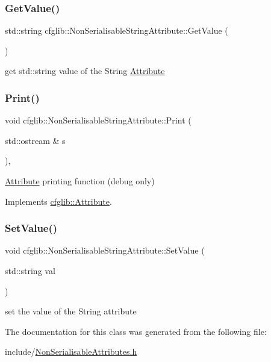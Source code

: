 \subsubsection{\texorpdfstring{Get\+Value()}{GetValue()}}
{\footnotesize\ttfamily std\+::string cfglib\+::\+Non\+Serialisable\+String\+Attribute\+::\+Get\+Value (\begin{DoxyParamCaption}{ }\end{DoxyParamCaption})\hspace{0.3cm}{\ttfamily [inline]}}

get std\+::string value of the String \hyperlink{classcfglib_1_1Attribute}{Attribute} \mbox{\label{classcfglib_1_1NonSerialisableStringAttribute_aedeb7ccd57b84ed2e3bcfc464038682e}} 
\subsubsection{\texorpdfstring{Print()}{Print()}}
{\footnotesize\ttfamily void cfglib\+::\+Non\+Serialisable\+String\+Attribute\+::\+Print (\begin{DoxyParamCaption}\item[{std\+::ostream \&}]{s }\end{DoxyParamCaption})\hspace{0.3cm}{\ttfamily [inline]}, {\ttfamily [virtual]}}

\hyperlink{classcfglib_1_1Attribute}{Attribute} printing function (debug only) 

Implements \hyperlink{classcfglib_1_1Attribute_af8d87ceddde146b92727e61823e0129b}{cfglib\+::\+Attribute}.

\mbox{\label{classcfglib_1_1NonSerialisableStringAttribute_a708afb5de2e1139c2119589c3e8bd434}} 
\subsubsection{\texorpdfstring{Set\+Value()}{SetValue()}}
{\footnotesize\ttfamily void cfglib\+::\+Non\+Serialisable\+String\+Attribute\+::\+Set\+Value (\begin{DoxyParamCaption}\item[{std\+::string}]{val }\end{DoxyParamCaption})\hspace{0.3cm}{\ttfamily [inline]}}

set the value of the String attribute 

The documentation for this class was generated from the following file\+:\begin{DoxyCompactItemize}
\item 
include/\hyperlink{NonSerialisableAttributes_8h}{Non\+Serialisable\+Attributes.\+h}\end{DoxyCompactItemize}
